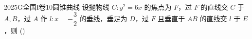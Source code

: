 
\begin{problem}{2025}{G}{全国I卷}{10}{圆锥曲线}
设抛物线 $C: y^2=6x$ 的焦点为 $F$，过 $F$ 的直线交 $C$ 于 $A,B$，过 $A$ 作 $l:x=-\dfrac{3}{2}$ 的垂线，垂足为 $D$，过 $F$ 且垂直于 $AB$ 的直线交 $l$ 于 $E$，则
(\hspace{1cm})
\begin{choices}
\end{choices}
\end{problem}